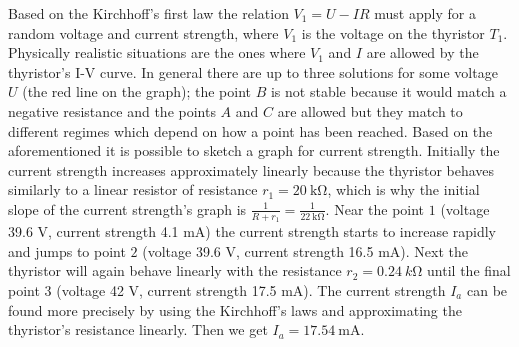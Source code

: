\documentclass[11pt]{article}
\begin{document}
{\begin{figure}[h]
\begin{center}
\begin{tikzpicture}[scale=1.4,
axes/.style=]
\end{tikzpicture}
\end{center}
\end{figure}

Based on the Kirchhoff’s first law the relation $V_1 = U - IR$ must apply for a random voltage and current strength, where $V_1$ is the voltage on the thyristor $T_1$. Physically realistic situations are the ones where $V_1$ and $I$ are allowed by the thyristor’s I-V curve. In general there are up to three solutions for some voltage $U$ (the red line on the graph); the point $B$ is not stable because it would match a negative resistance and the points $A$ and $C$ are allowed but they match to different regimes which depend on how a point has been reached. Based on the aforementioned it is possible to sketch a graph for current strength. Initially the current strength increases approximately linearly because the thyristor behaves similarly to a linear resistor of resistance $r_1=\SI{20}{\kilo\ohm}$, which is why the initial slope of the current strength’s graph is $\frac{1}{R + r_1}=\frac{1}{\SI{22}{\kilo\ohm}}$. Near the point $1$ (voltage 39.6 V, current strength 4.1 mA) the current strength starts to increase rapidly and jumps to point $2$ (voltage 39.6 V, current strength 16.5 mA). Next the thyristor will again behave linearly with the resistance $r_2=\SI{0.24}{k\ohm}$ until the final point $3$ (voltage 42 V, current strength 17.5 mA). The current strength $I_a$ can be found more precisely by using the Kirchhoff’s laws and approximating the thyristor’s resistance linearly. Then we get $I_a = \SI{17.54}{\milli\ampere}$.

\begin{figure}[h]
\begin{center}
\end{center}
\end{figure}}
\end{document}
